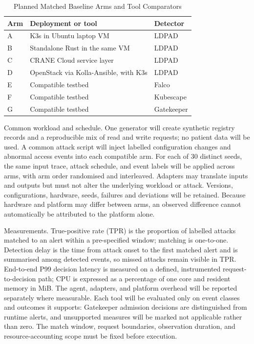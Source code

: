 \documentclass{ieeeaccess}
\renewcommand{\textbf}[1]{#1}
\begin{document}
\begin{table}[ht]
\caption{Planned Matched Baseline Arms and Tool Comparators}
\label{tab:baseline_arms}
\centering
\setlength{\tabcolsep}{2pt}
\begin{tabular}{|p{}|p{}|p{}|}
\hline
\textbf{Arm} & \textbf{Deployment or tool} & \textbf{Detector} \\
\hline
A & K3s in Ubuntu laptop VM & LDPAD \\
B & Standalone Rust in the same VM & LDPAD \\
C & CRANE Cloud service layer & LDPAD \\
D & OpenStack via Kolla-Ansible, with K3s & LDPAD \\
E & Compatible testbed & Falco \\
F & Compatible testbed & Kubescape \\
G & Compatible testbed & Gatekeeper \\
\hline
\end{tabular}
\end{table}

\noindent\textbf{Common workload and schedule.} One generator will create synthetic registry records and a reproducible mix of read and write requests; no patient data will be used. A common attack script will inject labelled configuration changes and abnormal access events into each compatible arm. For each of 30 distinct seeds, the same input trace, attack schedule, and event labels will be applied across arms, with arm order randomised and interleaved. Adapters may translate inputs and outputs but must not alter the underlying workload or attack. Versions, configurations, hardware, seeds, failures and deviations will be retained. Because hardware and platform may differ between arms, an observed difference cannot automatically be attributed to the platform alone.

\noindent\textbf{Measurements.} True-positive rate (TPR) is the proportion of labelled attacks matched to an alert within a pre-specified window; matching is one-to-one. Detection delay is the time from attack onset to the first matched alert and is summarised among detected events, so missed attacks remain visible in TPR. End-to-end P99 decision latency is measured on a defined, instrumented request-to-decision path; CPU is expressed as a percentage of one core and resident memory in MiB. The agent, adapters, and platform overhead will be reported separately where measurable. Each tool will be evaluated only on event classes and outcomes it supports: Gatekeeper admission decisions are distinguished from runtime alerts, and unsupported measures will be marked not applicable rather than zero. The match window, request boundaries, observation duration, and resource-accounting scope must be fixed before execution.
\end{document}
